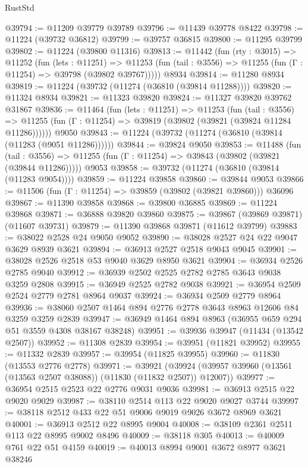 \begin{lexlean}{RustStd}
\begin{coremodule}
@39794 := @11209 @39779 @39789
@39796 := @11439 @39778 @8422
@39798 := @11224 (@39732 @36812)
@39799 := @39757 @36815
@39800 := @11295 @39799
@39802 := @11224 (@39800 @11316)
@39813 := @11442
    (fun (rty : @3015) =>
    @11252
      (fun (lets : @11251) =>
      @11253 (fun (tail : @3556) => @11255 (fun (Γ : @11254) => @39798 (@39802 @39767)))))
    @8934
@39814 := @11280 @8934
@39819 := @11224 (@39732 (@11274 (@36810 (@39814 @11288))))
@39820 := @11324 @8934
@39821 := @11323 @39820
@39824 := @11327 @39820 @39762 @31867
@39836 := @11464
    (fun (lets : @11251) =>
    @11253
      (fun (tail : @3556) =>
      @11255 (fun (Γ : @11254) => @39819 (@39802 (@39821 (@39824 @11284 @11286))))))
    @9050
@39843 := @11224 (@39732 (@11274 (@36810 (@39814 (@11283 (@9051 @11286))))))
@39844 := @39824 @9050
@39853 := @11488
    (fun (tail : @3556) => @11255 (fun (Γ : @11254) => @39843 (@39802 (@39821 (@39844 @11286)))))
    @9053
@39858 := @39732 (@11274 (@36810 (@39814 (@11283 @9054))))
@39859 := @11224 @39858
@39860 := @39844 @9053
@39866 := @11506 (fun (Γ : @11254) => @39859 (@39802 (@39821 @39860))) @36096
@39867 := @11390 @39858
@39868 := @39800 @36885
@39869 := @11224 @39868
@39871 := @36888 @39820 @39860
@39875 := @39867 (@39869 @39871) (@11607 @39731)
@39879 := @11390 @39868 @39871 (@11612 @39799)
@39883 := @38022 @2528 @24 @9050 @9052
@39890 := @38028 @2527 @24 @22 @9047 @3629 @8939 @3621
@39894 := @36913 @2527 @2518 @9043 @9045
@39901 := @38028 @2526 @2518 @53 @9040 @3629 @8950 @3621
@39904 := @36934 @2526 @2785 @9040
@39912 := @36939 @2502 @2525 @2782 @2785 @3643 @9038 @3259 @2808
@39915 := @36949 @2525 @2782 @9038
@39921 := @36954 @2509 @2524 @2779 @2781 @8964 @9037
@39924 := @36934 @2509 @2779 @8964
@39936 := @38060 @2507 @1464 @894 @2776 @2778 @3643 @8963 @12606 @84 @3259 @3259 @2839
@39947 := @36949 @1464 @894 @8963 (@36955 @659 @294 @51 @3559 @4308 @38167 @38248)
@39951 := @39936 @39947 (@11434 (@13542 @2507))
@39952 := @11308 @2839
@39954 := @39951 (@11821 @39952)
@39955 := @11332 @2839
@39957 := @39954 (@11825 @39955)
@39960 := @11830 (@13553 @2776 @2778)
@39971 := @39921
    (@39924 (@39957 @39960 (@13561 (@13563 @2507 @38088)) (@11830 (@11832 @2507)) @12007))
@39977 := @36954 @2515 @2523 @22 @2776 @9031 @9036
@39981 := @36913 @2515 @22 @9020 @9029
@39987 := @38110 @2514 @113 @22 @9020 @9027 @3744
@39997 := @38118 @2512 @433 @22 @51 @9006 @9019 @9026 @3672 @8969 @3621
@40001 := @36913 @2512 @22 @8995 @9004
@40008 := @38109 @2361 @2511 @113 @22 @8995 @9002 @8496
@40009 := @38118 @305
@40013 := @40009 @761 @22 @51 @4159
@40019 := @40013 @8994 @9001 @3672 @8977 @3621 @38246

\end{coremodule}
\end{lexlean}
